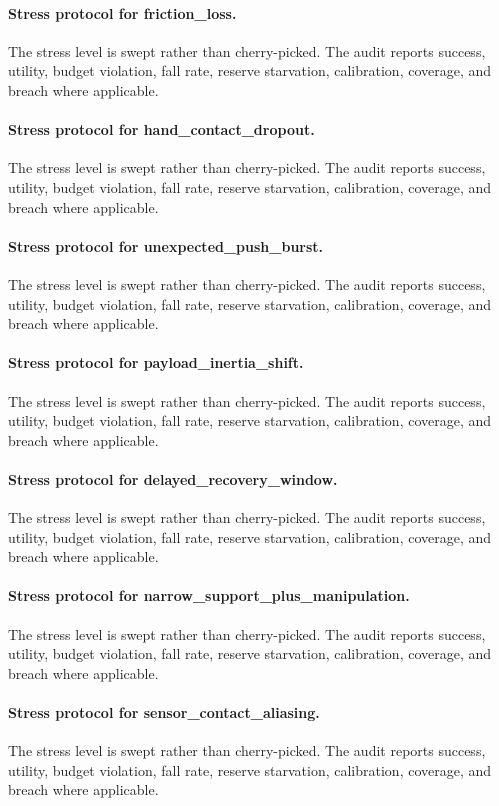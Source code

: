 \documentclass{article}
\begin{document}
\paragraph{Stress protocol for friction\_loss.} The stress level is swept rather than cherry-picked. The audit reports success, utility, budget violation, fall rate, reserve starvation, calibration, coverage, and breach where applicable.
\paragraph{Stress protocol for hand\_contact\_dropout.} The stress level is swept rather than cherry-picked. The audit reports success, utility, budget violation, fall rate, reserve starvation, calibration, coverage, and breach where applicable.
\paragraph{Stress protocol for unexpected\_push\_burst.} The stress level is swept rather than cherry-picked. The audit reports success, utility, budget violation, fall rate, reserve starvation, calibration, coverage, and breach where applicable.
\paragraph{Stress protocol for payload\_inertia\_shift.} The stress level is swept rather than cherry-picked. The audit reports success, utility, budget violation, fall rate, reserve starvation, calibration, coverage, and breach where applicable.
\paragraph{Stress protocol for delayed\_recovery\_window.} The stress level is swept rather than cherry-picked. The audit reports success, utility, budget violation, fall rate, reserve starvation, calibration, coverage, and breach where applicable.
\paragraph{Stress protocol for narrow\_support\_plus\_manipulation.} The stress level is swept rather than cherry-picked. The audit reports success, utility, budget violation, fall rate, reserve starvation, calibration, coverage, and breach where applicable.
\paragraph{Stress protocol for sensor\_contact\_aliasing.} The stress level is swept rather than cherry-picked. The audit reports success, utility, budget violation, fall rate, reserve starvation, calibration, coverage, and breach where applicable.
\end{document}
